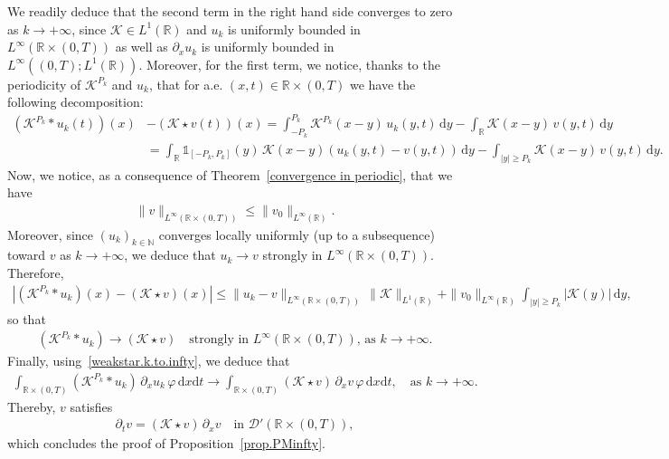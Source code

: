 \documentclass[11pt]{amsart}
\newcommand{\K}{\mathcal{K}}
\newcommand{\dd}{\mathrm{d}}
\newcommand{\pa}{\partial}
\newcommand{\R}{\mathbb{R}}
\newcommand{\N}{\mathbb{N}}
\begin{document}
\begin{appendix}
We readily deduce that the second term in the right hand side converges to zero as $k \to +\infty$, 
since $\K\in L^1(\R)$ and $u_k$  is uniformly bounded in $L^\infty(\R\times (0,T))$ as well as
$\pa_x u_k$  is uniformly bounded in $L^\infty((0,T); L^1(\R))$. Moreover, for the first term, we notice, thanks to the periodicity of $\K^{P_k}$ and $u_k$, that for a.e. $(x,t) \in \R\times(0,T)$ we have the following decomposition:
\begin{align*}
    (\K^{P_k}\ast u_k(t))(x) &- (\K \star v(t))(x) = \int_{-P_k}^{P_k} \K^{P_k}(x-y) \, u_k(y,t) \, \dd y - \int_\R \K(x-y) \, v(y,t) \, \dd y\\
    &= \int_\R \mathds{1}_{[-P_k,P_k]}(y) \,\K(x-y) \left(u_k(y,t)-v(y,t)\right) \, \dd y - \int_{|y|\geq P_k} \K(x-y) \, v(y,t) \, \dd y.
\end{align*}
Now, we notice, as a consequence of Theorem~\ref{convergence in periodic}, that we have
\begin{align*}
  \|v\|_{L^\infty(\R\times(0,T))} \leq \|v_0\|_{L^\infty(\R)}.
\end{align*}
Moreover, since $(u_k)_{k\in\N}$ converges locally uniformly (up to a subsequence) toward $v$ as $k \to +\infty$, we deduce that $u_k \to v$ strongly in $L^\infty(\R \times (0,T))$. Therefore,
\begin{align*}
    \left|(\K^{P_k}\ast u_k)(x) - (\K \star v)(x)\right| \leq \|u_k-v\|_{L^\infty(\R \times (0,T))} \, \|\K\|_{L^1(\R)} + \|v_0\|_{L^\infty(\R)} \int_{|y|\geq P_k} \left|\K(y)\right| \, \dd y,
\end{align*}
so that
\begin{align*}
    (\K^{P_k} \ast u_k) \to (\K\star v) \quad \mbox{strongly in }L^\infty(\R\times(0,T)), \, \mbox{as }k \to +\infty.
\end{align*}
Finally, using~\eqref{weakstar.k.to.infty}, we deduce that
\begin{align*}
    \int_{\R\times(0,T)} (\K^{P_k}\ast u_k) \, \pa_x u_k\, \varphi \, \dd x \dd t \to \int_{\R \times (0,T)} (\K \star v) \, \pa_x v \, \varphi\, \dd x \dd t, \quad \mbox{as }k\to+\infty.
\end{align*}
Thereby, $v$ satisfies
\begin{align*}
    \pa_t v = (\K\star v) \, \pa_x v \quad \mbox{in }\mathcal{D}'(\R \times (0,T)),
\end{align*}
which concludes the proof of Proposition~\ref{prop.PMinfty}.


\end{appendix}




\end{document}
